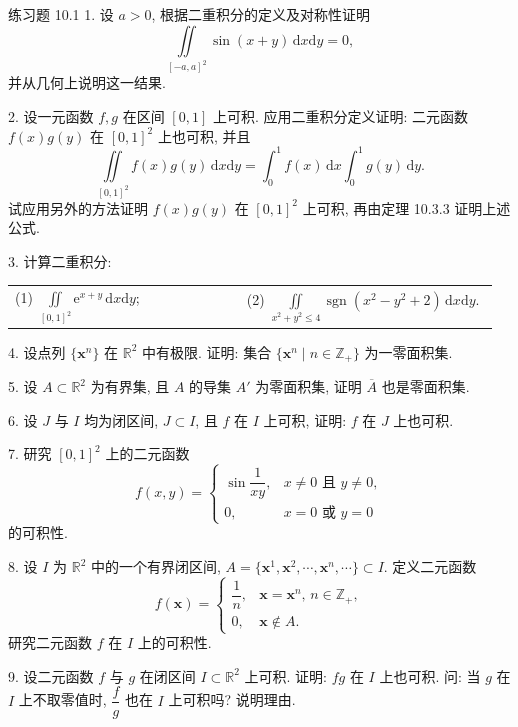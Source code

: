 \begin{exblock}{练习题 10.1}
1. 设 $a > 0$, 根据二重积分的定义及对称性证明
\[
  \iint\limits_{[-a, a]^{2}} \sin(x+y)\,\mathrm{d}x\mathrm{d}y = 0,
\]
并从几何上说明这一结果.

2. 设一元函数 $f, g$ 在区间 $[0, 1]$ 上可积. 应用二重积分定义证明: 二元函数 $f(x)g(y)$ 在 $[0, 1]^{2}$ 上也可积, 并且
\[
  \iint\limits_{[0, 1]^{2}} f(x)g(y)\,\mathrm{d}x\mathrm{d}y = \int_{0}^{1} f(x)\,\mathrm{d}x \int_{0}^{1} g(y)\,\mathrm{d}y.
\]
试应用另外的方法证明 $f(x)g(y)$ 在 $[0, 1]^{2}$ 上可积, 再由定理 10.3.3 证明上述公式.

3. 计算二重积分:

\begin{tabular}{@{}p{0.46\linewidth}p{0.50\linewidth}@{}}
(1) $\displaystyle\iint\limits_{[0, 1]^{2}} \mathrm{e}^{x+y}\,\mathrm{d}x\mathrm{d}y$; & (2) $\displaystyle\iint\limits_{x^{2}+y^{2} \leqslant 4} \operatorname{sgn}(x^{2}-y^{2}+2)\,\mathrm{d}x\mathrm{d}y$.
\end{tabular}

4. 设点列 $\{\boldsymbol{x}^n\}$ 在 $\mathbb{R}^2$ 中有极限. 证明: 集合 $\{\boldsymbol{x}^n \mid n \in \mathbb{Z}_+\}$ 为一零面积集.

5. 设 $A \subset \mathbb{R}^{2}$ 为有界集, 且 $A$ 的导集 $A'$ 为零面积集, 证明 $\overline{A}$ 也是零面积集.

6. 设 $J$ 与 $I$ 均为闭区间, $J \subset I$, 且 $f$ 在 $I$ 上可积, 证明: $f$ 在 $J$ 上也可积.

7. 研究 $[0, 1]^{2}$ 上的二元函数
\[
  f(x, y) = \begin{cases}
    \sin\dfrac{1}{xy}, & x \neq 0 \text{ 且 } y \neq 0, \\
    0, & x = 0 \text{ 或 } y = 0
  \end{cases}
\]
的可积性.

8. 设 $I$ 为 $\mathbb{R}^2$ 中的一个有界闭区间, $A = \{\boldsymbol{x}^1, \boldsymbol{x}^2, \cdots, \boldsymbol{x}^n, \cdots\} \subset I$. 定义二元函数
\[
  f(\boldsymbol{x}) = \begin{cases}
    \dfrac{1}{n}, & \boldsymbol{x} = \boldsymbol{x}^{n},\, n \in \mathbb{Z}_{+}, \\
    0, & \boldsymbol{x} \notin A.
  \end{cases}
\]
研究二元函数 $f$ 在 $I$ 上的可积性.

9. 设二元函数 $f$ 与 $g$ 在闭区间 $I \subset \mathbb{R}^{2}$ 上可积. 证明: $fg$ 在 $I$ 上也可积. 问: 当 $g$ 在 $I$ 上不取零值时, $\dfrac{f}{g}$ 也在 $I$ 上可积吗? 说明理由.
\end{exblock}

